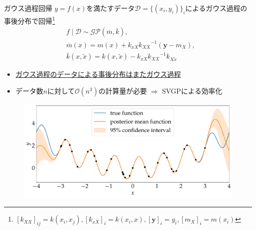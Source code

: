 \begin{frame}{ガウス過程回帰}
$y=f(x)$を満たすデータ$\mathcal{D}=\{(x_{i},y_{i})\}_{i}$によるガウス過程の事後分布で回帰\footnote{$[k_{XX}]_{ij}=k(x_{i},x_{j}),[k_{xX}]_{i}=k(x_{i},x),[\bm{y}]_{i}=y_{i},[m_{X}]_{i}=m(x_{i})$}
\begin{align*}
  &f\mid\mathcal{D}\sim\mathcal{GP}(\overline{m},\overline{k}),\\
  &\overline{m}(x)=m(x)+k_{xX}{k_{XX}}^{-1}(\bm{y}-m_{X}),\\
  &\overline{k}(x,\tilde{x})=k(x,\tilde{x})-k_{xX}{k_{XX}}^{-1}k_{X\tilde{x}}
\end{align*}
\begin{itemize}
  \item[\checkmark] \underline{ガウス過程のデータによる事後分布はまたガウス過程}
  \item[\checkmark] データ数$n$に対して$\mathcal{O}(n^{3})$の計算量が必要 $\Longrightarrow$ SVGPによる効率化
\end{itemize}
\begin{figure}
  \includegraphics[height=0.35\textheight]{figs/gpr_sample.pdf}
\end{figure}
\end{frame}

